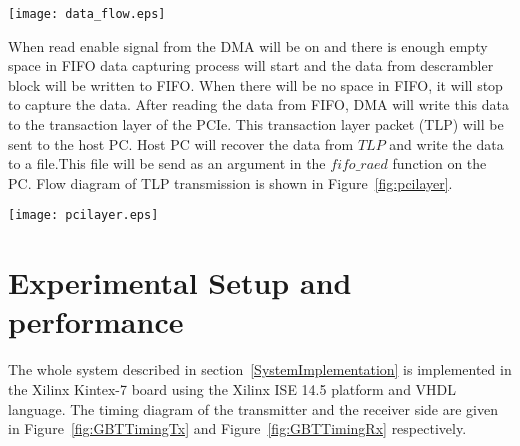 \documentclass[10pt, conference, compsocconf]{IEEEtran}
\begin{document}
\begin{figure*}[htb]
\centering
\texttt{[image: data\_flow.eps]}
\caption{Internal data flow diagram of the proposed system }
\label{fig:data_flow}
\end{figure*}
\par
When read enable signal from the DMA will be on and there is enough empty space in FIFO data capturing process will start and the data from descrambler block will be written to FIFO. When there will be no space in FIFO, it will stop to capture the data. After reading the data from FIFO, DMA will write this data to the transaction layer of the PCIe. This transaction layer packet (TLP) will be sent to the host PC. Host PC will recover the data from $TLP$ and write the data to a file.This file will be send as an argument in the $fifo\_raed$ function on the PC. Flow diagram of TLP transmission is shown in Figure~\ref{fig:pcilayer}. 
\begin{figure*}[h]
\centering
\texttt{[image: pcilayer.eps]}
\vspace*{-8pt}
\caption{Structure of PCIe layers}
\label{fig:pcilayer}
\end{figure*}





\section{Experimental Setup and performance} \label{PerformenceEvoluation}
The whole system described in section~\ref{SystemImplementation} is implemented in the Xilinx Kintex-7 board using the Xilinx ISE 14.5 platform and VHDL language.  The timing diagram of the transmitter and the receiver side are given in Figure~\ref{fig:GBTTimingTx} and Figure~\ref{fig:GBTTimingRx} respectively.
\end{document}
